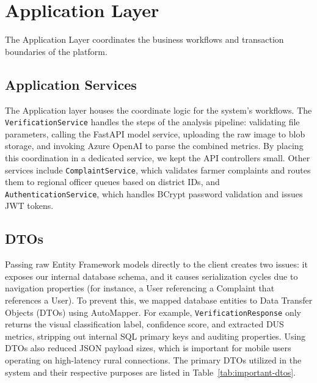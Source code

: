 \section{Application Layer}
\label{sec:application-layer}

The Application Layer coordinates the business workflows and transaction boundaries of the platform.

\subsection{Application Services}
The Application layer houses the coordinate logic for the system's workflows. The \texttt{VerificationService} handles the steps of the analysis pipeline: validating file parameters, calling the FastAPI model service, uploading the raw image to blob storage, and invoking Azure OpenAI to parse the combined metrics. By placing this coordination in a dedicated service, we kept the API controllers small. Other services include \texttt{ComplaintService}, which validates farmer complaints and routes them to regional officer queues based on district IDs, and \texttt{AuthenticationService}, which handles BCrypt password validation and issues JWT tokens.

\subsection{DTOs}
Passing raw Entity Framework models directly to the client creates two issues: it exposes our internal database schema, and it causes serialization cycles due to navigation properties (for instance, a User referencing a Complaint that references a User). To prevent this, we mapped database entities to Data Transfer Objects (DTOs) using AutoMapper. For example, \texttt{VerificationResponse} only returns the visual classification label, confidence score, and extracted DUS metrics, stripping out internal SQL primary keys and auditing properties. Using DTOs also reduced JSON payload sizes, which is important for mobile users operating on high-latency rural connections. The primary DTOs utilized in the system and their respective purposes are listed in Table~\ref{tab:important-dtos}.

